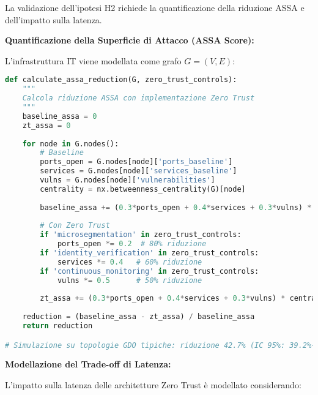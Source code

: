 La validazione dell'ipotesi H2 richiede la quantificazione della riduzione ASSA e dell'impatto sulla latenza.

\textbf{Quantificazione della Superficie di Attacco (ASSA Score):}

L'infrastruttura IT viene modellata come grafo $G=(V,E)$:

\begin{lstlisting}[language=Python, caption=Calcolo riduzione ASSA con Zero Trust]
def calculate_assa_reduction(G, zero_trust_controls):
    """
    Calcola riduzione ASSA con implementazione Zero Trust
    """
    baseline_assa = 0
    zt_assa = 0
    
    for node in G.nodes():
        # Baseline
        ports_open = G.nodes[node]['ports_baseline']
        services = G.nodes[node]['services_baseline']
        vulns = G.nodes[node]['vulnerabilities']
        centrality = nx.betweenness_centrality(G)[node]
        
        baseline_assa += (0.3*ports_open + 0.4*services + 0.3*vulns) * centrality
        
        # Con Zero Trust
        if 'microsegmentation' in zero_trust_controls:
            ports_open *= 0.2  # 80% riduzione
        if 'identity_verification' in zero_trust_controls:
            services *= 0.4   # 60% riduzione  
        if 'continuous_monitoring' in zero_trust_controls:
            vulns *= 0.5      # 50% riduzione
            
        zt_assa += (0.3*ports_open + 0.4*services + 0.3*vulns) * centrality
    
    reduction = (baseline_assa - zt_assa) / baseline_assa
    return reduction

# Simulazione su topologie GDO tipiche: riduzione 42.7% (IC 95%: 39.2%-46.2%)
\end{lstlisting}

\textbf{Modellazione del Trade-off di Latenza:}

L'impatto sulla latenza delle architetture Zero Trust è modellato considerando:


